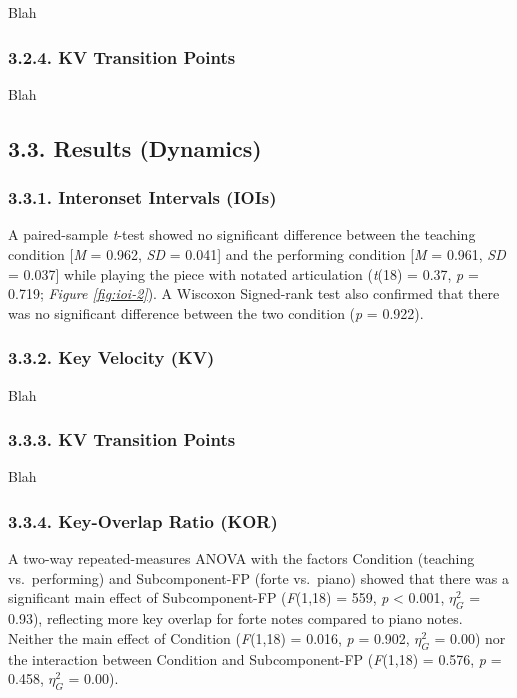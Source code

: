 \documentclass[
  english,
  man,floatsintext]{apa6}
\begin{document}
Blah

\hypertarget{kv-transition-points-2}{%
\subsubsection{3.2.4. KV Transition Points}\label{kv-transition-points-2}}

Blah

\hypertarget{results-dynamics-1}{%
\subsection{3.3. Results (Dynamics)}\label{results-dynamics-1}}

\hypertarget{interonset-intervals-iois-3}{%
\subsubsection{3.3.1. Interonset Intervals (IOIs)}\label{interonset-intervals-iois-3}}

A paired-sample \emph{t}-test showed no significant difference between the teaching condition {[}\emph{M} = 0.962, \emph{SD} = 0.041{]} and the performing condition {[}\emph{M} = 0.961, \emph{SD} = 0.037{]} while playing the piece with notated articulation (\emph{t}(18) = 0.37, \emph{p} = 0.719; \emph{Figure \ref{fig:ioi-2}}). A Wiscoxon Signed-rank test also confirmed that there was no significant difference between the two condition (\emph{p} = 0.922).

\hypertarget{key-velocity-kv-3}{%
\subsubsection{3.3.2. Key Velocity (KV)}\label{key-velocity-kv-3}}

Blah

\hypertarget{kv-transition-points-3}{%
\subsubsection{3.3.3. KV Transition Points}\label{kv-transition-points-3}}

Blah

\hypertarget{key-overlap-ratio-kor-1}{%
\subsubsection{3.3.4. Key-Overlap Ratio (KOR)}\label{key-overlap-ratio-kor-1}}

A two-way repeated-measures ANOVA with the factors Condition (teaching vs.~performing) and Subcomponent-FP (forte vs.~piano) showed that there was a significant main effect of Subcomponent-FP (\emph{F}(1,18) = 559, \emph{p} \textless{} 0.001, \(\eta_G^2\) = 0.93), reflecting more key overlap for forte notes compared to piano notes. Neither the main effect of Condition (\emph{F}(1,18) = 0.016, \emph{p} = 0.902, \(\eta_G^2\) = 0.00) nor the interaction between Condition and Subcomponent-FP (\emph{F}(1,18) = 0.576, \emph{p} = 0.458, \(\eta_G^2\) = 0.00).
\end{document}
